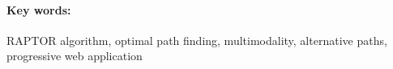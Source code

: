 \documentclass[12pt, oneside]{book}
\begin{document}
\paragraph*{Key words:}
RAPTOR algorithm, optimal path finding, multimodality, alternative paths, progressive web application


\newpage 

\tableofcontents



\newpage 

\listoffigures
\listoftables


\mainmatter


 



% 











\newpage	

\backmatter

\thispagestyle{empty}
\nocite{*}
\clearpage


 



%
%
%
%
\end{document}
